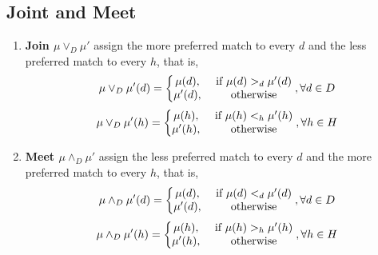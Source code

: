 \documentclass[11pt]{elegantbook}
\begin{document}
\subsection{Joint and Meet}
\begin{definition}
    \normalfont
    \begin{enumerate}
        \item \textbf{Join $\mu \vee_D \mu'$} assign the more preferred match to every $d$ and the less preferred match to every $h$, that is,
        \begin{equation}
            \begin{aligned}
                \mu \vee_D \mu'(d)=\left\{\begin{matrix}
                    \mu(d),&\textnormal{ if }\mu(d)>_d\mu'(d)\\
                    \mu'(d),&\textnormal{ otherwise}
                \end{matrix}\right., \forall d\in D
            \end{aligned}
            \nonumber
        \end{equation}
        \begin{equation}
            \begin{aligned}
                \mu \vee_D \mu'(h)=\left\{\begin{matrix}
                    \mu(h),&\textnormal{ if }\mu(h)<_h\mu'(h)\\
                    \mu'(h),&\textnormal{ otherwise}
                \end{matrix}\right., \forall h\in H
            \end{aligned}
            \nonumber
        \end{equation}
        \item \textbf{Meet $\mu\wedge_D\mu'$} assign the less preferred match to every $d$ and the more preferred match to every $h$, that is,
        \begin{equation}
            \begin{aligned}
                \mu \wedge_D \mu'(d)=\left\{\begin{matrix}
                    \mu(d),&\textnormal{ if }\mu(d)<_d\mu'(d)\\
                    \mu'(d),&\textnormal{ otherwise}
                \end{matrix}\right., \forall d\in D
            \end{aligned}
            \nonumber
        \end{equation}
        \begin{equation}
            \begin{aligned}
                \mu \wedge_D \mu'(h)=\left\{\begin{matrix}
                    \mu(h),&\textnormal{ if }\mu(h)>_h\mu'(h)\\
                    \mu'(h),&\textnormal{ otherwise}
                \end{matrix}\right., \forall h\in H
            \end{aligned}
            \nonumber
        \end{equation}
    \end{enumerate}
\end{definition}
\end{document}

